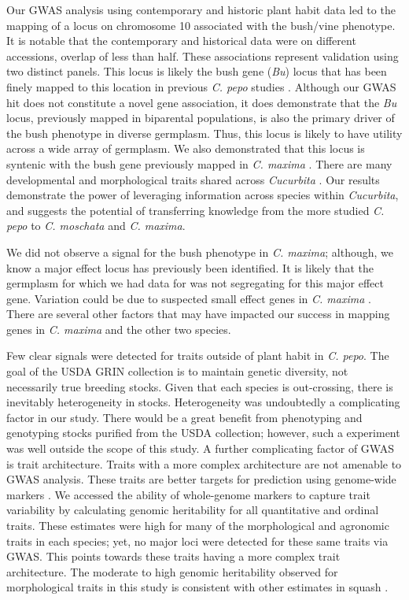 \documentclass[utf8]{FrontiersinHarvard} %
\begin{document}
Our GWAS analysis using contemporary and historic plant habit data led to the mapping of a locus on chromosome 10 associated with the bush/vine phenotype. It is notable that the contemporary and historical data were on different accessions, overlap of less than half.  These associations represent validation using two distinct panels. This locus is likely the bush gene (\textit{Bu}) locus that has been finely mapped to this location in previous \textit{C. pepo} studies \citep{Xiang2018, Ding2021}. Although our GWAS hit does not constitute a novel gene association, it does demonstrate that the \textit{Bu} locus, previously mapped in biparental populations, is also the primary driver of the bush phenotype in diverse germplasm. Thus, this locus is likely to have utility across a wide array of germplasm. We also demonstrated that this locus is syntenic with the bush gene previously mapped in \textit{C. maxima} \citep{Zhang2015}. There are many developmental and morphological traits shared across \textit{Cucurbita} \citep{Paris2005}. Our results demonstrate the power of leveraging information across species within \textit{Cucurbita}, and suggests the potential of transferring knowledge from the more studied \textit{C. pepo} to \textit{C. moschata} and \textit{C. maxima}.

We did not observe a signal for the bush phenotype in \textit{C. maxima}; although, we know a major effect locus has previously been identified. It is likely that the germplasm for which we had data for was not segregating for this major effect gene. Variation could be due to suspected small effect genes in \textit{C. maxima} \citep{Loy2004}. There are several other factors that may have impacted our success in mapping genes in \textit{C. maxima} and the other two species.

Few clear signals were detected for traits outside of plant habit in \textit{C. pepo}. The goal of the USDA GRIN collection is to maintain genetic diversity, not necessarily true breeding stocks. Given that each species is out-crossing, there is inevitably heterogeneity in stocks. Heterogeneity was undoubtedly a complicating factor in our study. There would be a great benefit from phenotyping and genotyping stocks purified from the USDA collection; however, such a experiment was well outside the scope of this study. A further complicating factor of GWAS is trait architecture. Traits with a more complex architecture are not amenable to GWAS analysis. These traits are better targets for prediction using genome-wide markers \citep{Meuwissen2001}. We accessed the ability of whole-genome markers to capture trait variability by calculating genomic heritability for all quantitative and ordinal traits. These estimates were high for many of the morphological and agronomic traits in each species; yet, no major loci were detected for these same traits via GWAS. This points towards these traits having a more complex trait architecture. The moderate to high genomic heritability observed for morphological traits in this study is consistent with other estimates in squash \citep{Hernandez2020}.
\end{document}

